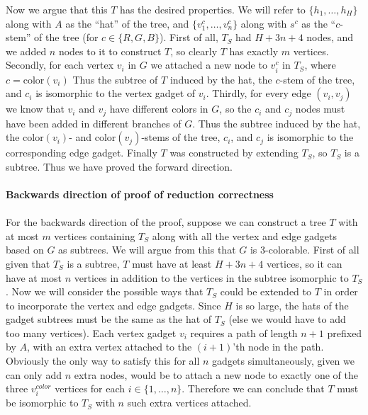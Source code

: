 Now we argue that this $T$ has the desired properties.
We will refer to $\{h_1,\ldots,h_H\}$ along with $A$
as the ``hat'' of the tree, and $\{v_1^c,\ldots,v_n^c\}$ along
with $s^c$ as the ``$c$-stem'' of the tree (for $c \in \{R, G, B\}$).
First of all, $T_S$ had $H + 3n + 4$ nodes, and we 
added $n$ nodes to it to construct $T$, so clearly $T$
has exactly $m$ vertices.
Secondly, for each vertex $v_i$ in $G$ we attached a new node to
$v_i^c$ in $T_S$, where $c = \text{color}(v_i)$
Thus the subtree of $T$ induced by the hat, the $c$-stem
of the tree, and $c_i$ is isomorphic to the vertex gadget
of $v_i$. Thirdly, for every edge $(v_i, v_j)$ we know
that $v_i$ and $v_j$ have different colors in $G$, so
the $c_i$ and $c_j$ nodes must have been added in different
branches of $G$. Thus the subtree induced by the hat,
the $\text{color}(v_i)$- and $\text{color}(v_j)$-stems of the
tree, $c_i$, and $c_j$ is isomorphic to the corresponding
edge gadget. Finally $T$ was constructed by extending $T_S$,
so $T_S$ is a subtree. Thus we have proved the forward
direction.\\
\\
{\bf Backwards direction of proof of reduction correctness}\\
\\
For the backwards direction of the proof, suppose we can
construct a tree $T$ with at most $m$ vertices containing
$T_S$ along with all the vertex and edge gadgets based on
$G$ as subtrees. We will argue from this that $G$ is 3-colorable.
First of all given that $T_S$ is a subtree, $T$ must have at least
$H + 3n + 4$ vertices, so it can have at most $n$ vertices
in addition to the vertices in the subtree isomorphic to $T_S$.
Now we will consider the possible ways that $T_S$ could be
extended to $T$ in order to incorporate the vertex and
edge gadgets. Since $H$ is so large, the hats of the gadget
subtrees must be the same as the hat of $T_S$ (else we would
have to add too many vertices).
Each vertex gadget $v_i$ requires
a path of length $n + 1$ prefixed by $A$, with an extra vertex
attached to the $(i+1)$'th node in the path. Obviously the
only way to satisfy this for all $n$ gadgets simultaneously,
given we can only add $n$ extra nodes,
would be to attach a new node to exactly one
of the three $v_i^{color}$ vertices for each
$i \in \{1,\ldots,n\}$. Therefore we can conclude that $T$
must be isomorphic to $T_S$ with $n$ such extra vertices attached.


